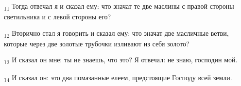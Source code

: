 \begin{tcolorbox}
\textsubscript{11} Тогда отвечал я и сказал ему: что значат те две маслины с правой стороны светильника и с левой стороны его?
\end{tcolorbox}
\begin{tcolorbox}
\textsubscript{12} Вторично стал я говорить и сказал ему: что значат две масличные ветви, которые через две золотые трубочки изливают из себя золото?
\end{tcolorbox}
\begin{tcolorbox}
\textsubscript{13} И сказал он мне: ты не знаешь, что это? Я отвечал: не знаю, господин мой.
\end{tcolorbox}
\begin{tcolorbox}
\textsubscript{14} И сказал он: это два помазанные елеем, предстоящие Господу всей земли.
\end{tcolorbox}

